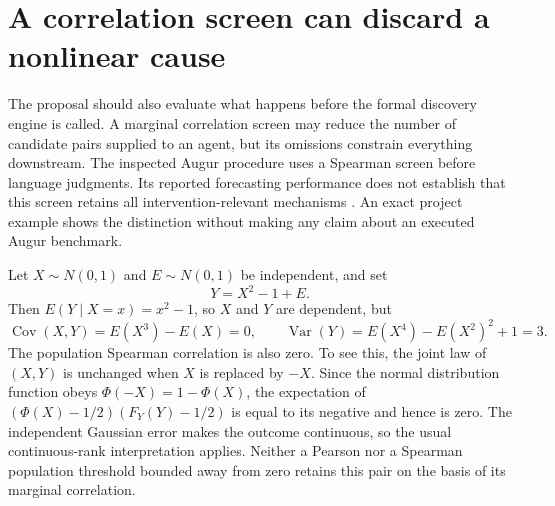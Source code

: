\section{A correlation screen can discard a nonlinear cause}
\label{exec14:l4-nonlinear-screen}

The proposal should also evaluate what happens before the formal discovery
engine is called. A marginal correlation screen may reduce the number of
candidate pairs supplied to an agent, but its omissions constrain everything
downstream. The inspected Augur procedure uses a Spearman screen before
language judgments. Its reported forecasting performance does not establish
that this screen retains all intervention-relevant mechanisms
\citep{exec13_census_augur_arxiv}. An exact project example shows the
distinction without making any claim about an executed Augur benchmark.

Let $X\sim N(0,1)$ and $E\sim N(0,1)$ be independent, and set
\[
 Y=X^2-1+E.
\]
Then $E(Y\mid X=x)=x^2-1$, so $X$ and $Y$ are dependent, but
\[
 \operatorname{Cov}(X,Y)=E(X^3)-E(X)=0,
 \qquad \operatorname{Var}(Y)=E(X^4)-E(X^2)^2+1=3.
\]
The population Spearman correlation is also zero. To see this, the joint law
of $(X,Y)$ is unchanged when $X$ is replaced by $-X$. Since the normal
distribution function obeys $\Phi(-X)=1-\Phi(X)$, the expectation of
$(\Phi(X)-1/2)(F_Y(Y)-1/2)$ is equal to its negative and hence is zero.
The independent Gaussian error makes the outcome continuous, so the usual
continuous-rank interpretation applies. Neither a Pearson nor a Spearman
population threshold bounded away from zero retains this pair on the basis
of its marginal correlation.

